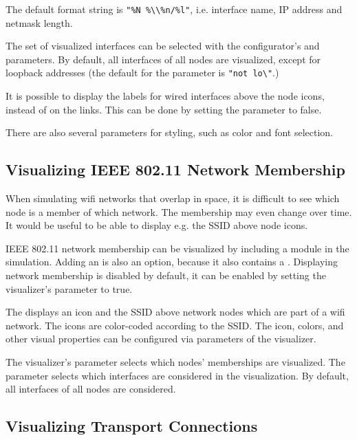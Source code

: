 The default format string is
\texttt{"\%N \%\textbackslash\textbackslash\%n/\%l"}, i.e. interface name, IP address and
netmask length.

The set of visualized interfaces can be selected with the configurator's
 and  parameters. By default, all
interfaces of all nodes are visualized, except for loopback addresses (the default for the
 parameter is \texttt{"not lo\textbackslash*"}.)

It is possible to display the labels for wired interfaces above the node icons,
instead of on the links. This can be done by setting the
 parameter to false.

There are also several parameters for styling, such as color and font selection.


\subsection{Visualizing IEEE 802.11 Network Membership}
\label{sec:visualization:ieee-80211-network-membership}

When simulating wifi networks that overlap in space, it is difficult to see
which node is a member of which network. The membership may even change over
time. It would be useful to be able to display e.g. the SSID above node icons.

IEEE 802.11 network membership can be visualized by including a
 module in the simulation. Adding an  is
also an option, because it also contains a . Displaying
network membership is disabled by default, it can be enabled by setting the
visualizer's  parameter to true.

The  displays an icon and the SSID above network nodes which
are part of a wifi network. The icons are color-coded according to the SSID. The
icon, colors, and other visual properties can be configured via parameters of
the visualizer.

The visualizer's  parameter selects which nodes' memberships are
visualized. The  parameter selects which interfaces are
considered in the visualization. By default, all interfaces of all nodes are
considered.


\subsection{Visualizing Transport Connections}
\label{sec:visualization:transport-connections}

